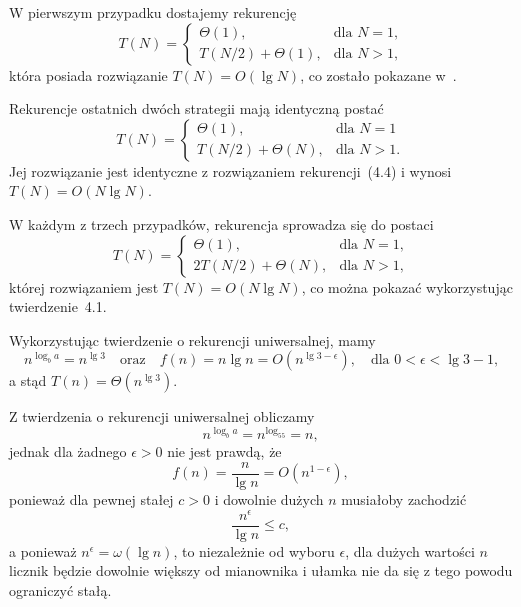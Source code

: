 
\subproblem %
W pierwszym przypadku dostajemy rekurencję
\[
	T(N) = \begin{cases}
		\Theta(1), & \text{dla $N=1$,} \\
		T(N/2)+\Theta(1), & \text{dla $N>1$,}
	\end{cases}
\]
która posiada rozwiązanie $T(N)=O(\lg N)$, co zostało pokazane w~.

\medskip
\noindent Rekurencje ostatnich dwóch strategii mają identyczną postać
\[
	T(N) = \begin{cases}
		\Theta(1), & \text{dla $N=1$} \\
		T(N/2)+\Theta(N), & \text{dla $N>1$.}
	\end{cases}
\]
Jej rozwiązanie jest identyczne z rozwiązaniem rekurencji~(4.4) i wynosi $T(N)=O(N\lg N)$.

\subproblem %
W każdym z trzech przypadków, rekurencja sprowadza się do postaci
\[
	T(N) = \begin{cases}
		\Theta(1), & \text{dla $N=1$,} \\
		2T(N/2)+\Theta(N), & \text{dla $N>1$,}
	\end{cases}
\]
której rozwiązaniem jest $T(N)=O(N\lg N)$, co można pokazać wykorzystując twierdzenie~4.1.


\subproblem %
Wykorzystując twierdzenie o rekurencji uniwersalnej, mamy
\[
	n^{\log_ba} = n^{\lg3} \quad\text{oraz}\quad f(n) = n\lg n = O(n^{\lg3-\epsilon}), \quad\text{dla $0<\epsilon<\lg3-1$,}
\]
a stąd $T(n)=\Theta(n^{\lg3})$.

\subproblem %
Z twierdzenia o rekurencji uniwersalnej obliczamy
\[
	n^{\log_ba} = n^{\log_55} = n,
\]
jednak dla żadnego $\epsilon>0$ nie jest prawdą, że
\[
	f(n) = \frac{n}{\lg n} = O(n^{1-\epsilon}),
\]
ponieważ dla pewnej stałej $c>0$ i dowolnie dużych $n$ musiałoby zachodzić
\[
	\frac{n^\epsilon}{\lg n} \le c,
\]
a ponieważ $n^\epsilon=\omega(\lg n)$, to niezależnie od wyboru $\epsilon$, dla dużych wartości $n$ licznik będzie dowolnie większy od mianownika i ułamka nie da się z tego powodu ograniczyć stałą.

